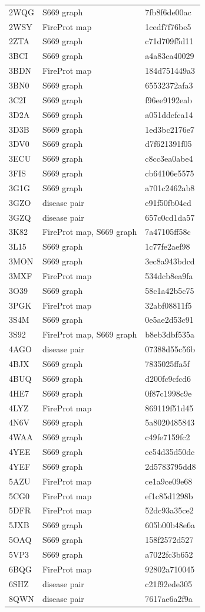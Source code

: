\begin{longtable}{lll}
2WQG & S669 graph & 7fb8f6de00ac\\
2WSY & FireProt map & 1cedf7f76be5\\
2ZTA & S669 graph & c71d709f5d11\\
3BCI & S669 graph & a4a83ea40029\\
3BDN & FireProt map & 184d751449a3\\
3BN0 & S669 graph & 65532372afa3\\
3C2I & S669 graph & f96ee9192eab\\
3D2A & S669 graph & a051ddefca14\\
3D3B & S669 graph & 1ed3bc2176e7\\
3DV0 & S669 graph & d7f621391f05\\
3ECU & S669 graph & c8cc3ea0abe4\\
3FIS & S669 graph & cb64106e5575\\
3G1G & S669 graph & a701c2462ab8\\
3GZO & disease pair & e91f50fb04cd\\
3GZQ & disease pair & 657c0cd1da57\\
3K82 & FireProt map, S669 graph & 7a47105ff58c\\
3L15 & S669 graph & 1c77fe2aef98\\
3MON & S669 graph & 3ec8a943bdcd\\
3MXF & FireProt map & 534dcb8ea9fa\\
3O39 & S669 graph & 58c1a42b5c75\\
3PGK & FireProt map & 32abf08811f5\\
3S4M & S669 graph & 0e5ae2d53c91\\
3S92 & FireProt map, S669 graph & b8eb3dbf535a\\
4AGO & disease pair & 07388d55c56b\\
4BJX & S669 graph & 7835025ffa5f\\
4BUQ & S669 graph & d200fc9cfcd6\\
4HE7 & S669 graph & 0f87c1998c9e\\
4LYZ & FireProt map & 869119f51d45\\
4N6V & S669 graph & 5a8020485843\\
4WAA & S669 graph & c49fe7159fc2\\
4YEE & S669 graph & ee54d35d50dc\\
4YEF & S669 graph & 2d5783795dd8\\
5AZU & FireProt map & ce1a9ce09e68\\
5CG0 & FireProt map & ef1c85d1298b\\
5DFR & FireProt map & 52dc93a35ce2\\
5JXB & S669 graph & 605b00b48e6a\\
5OAQ & S669 graph & 158f2572d527\\
5VP3 & S669 graph & a7022fc3b652\\
6BQG & FireProt map & 92802a710045\\
6SHZ & disease pair & c21f92ede305\\
8QWN & disease pair & 7617ae6a2f9a\\
\hline\end{longtable}
